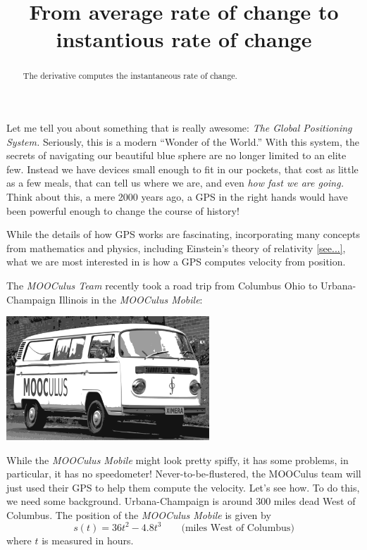 \documentclass{ximera}
\title{From average rate of change to instantious rate of change}
\begin{document}
\begin{abstract}
The derivative computes the instantaneous rate of change. 
\end{abstract}
\maketitle



Let me tell you about something that is really awesome: \textit{The
  Global Positioning System.} Seriously, this is a modern ``Wonder of
the World.'' With this system, the secrets of navigating our beautiful
blue sphere are no longer limited to an elite few. Instead we have
devices small enough to fit in our pockets, that cost as little as a
few meals, that can tell us where we are, and even \textit{how fast we
  are going.} Think about this, a mere 2000 years ago, a GPS in the
right hands would have been powerful enough to change the course of
history!

While the details of how GPS works are fascinating, incorporating many
concepts from mathematics and physics, including Einstein's theory of
relativity \ref{see...}, what we are most interested in is how a GPS
computes velocity from position.

The \textit{MOOCulus Team} recently took a road trip from Columbus
Ohio to Urbana-Champaign Illinois in the \textit{MOOCulus Mobile}:
\begin{image}
\includegraphics[width=3in]{mooculusMobile.pdf}
\end{image}
While the \textit{MOOCulus Mobile} might look pretty spiffy, it has
some problems, in particular, it has no speedometer!
Never-to-be-flustered, the MOOCulus team will just used their GPS to
help them compute the velocity. Let's see how. To do this, we need
some background. Urbana-Champaign is around 300 miles dead West of
Columbus. The position of the \textit{MOOCulus Mobile} is given by
\[
s(t) = 36t^2 -4.8t^3 \qquad\text{(miles West of Columbus)}
\]
where $t$ is measured in hours. 
\end{document}

